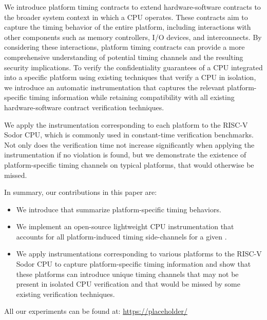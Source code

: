 We introduce platform timing contracts to extend hardware-software contracts to the broader system context in which a CPU operates.
These contracts aim to capture the timing behavior of the entire platform, including interactions with other components such as memory controllers, I/O devices, and interconnects.
By considering these interactions, platform timing contracts can provide a more comprehensive understanding of potential timing channels and the resulting security implications.
To verify the confidentiality guarantees of a CPU integrated into a specific platform using existing techniques that verify a CPU in isolation, we introduce an automatic instrumentation that captures the relevant platform-specific timing information while retaining compatibility with all existing hardware-software contract verification techniques.

We apply the instrumentation corresponding to each platform to the RISC-V Sodor CPU, which is commonly used in constant-time verification benchmarks.
Not only does the verification time not increase significantly when applying the instrumentation if no violation is found, but we demonstrate the existence of platform-specific timing channels on typical platforms, that would otherwise be missed.

In summary, our contributions in this paper are:
\begin{itemize}
    \item We introduce \pics that summarize platform-specific timing behaviors.
    \item We implement an open-source lightweight CPU instrumentation that accounts for all platform-induced timing side-channels for a given \pic.
    \item We apply instrumentations corresponding to various platforms to the RISC-V Sodor CPU to capture platform-specific timing information and show that these platforms can introduce unique timing channels that may not be present in isolated CPU verification and that would be missed by some existing verification techniques.
\end{itemize}

All our experiments can be found at: \url{https://placeholder/} 
